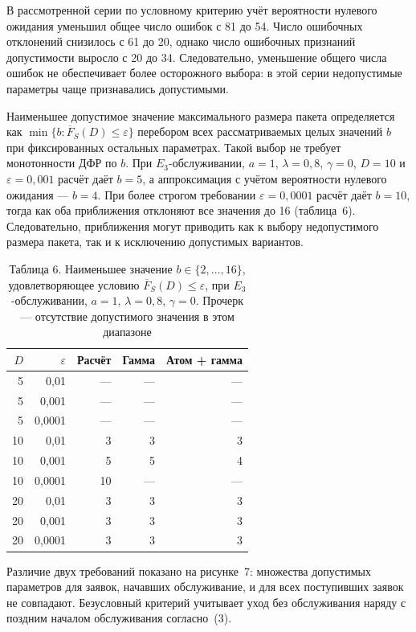 В рассмотренной серии по условному критерию учёт вероятности нулевого ожидания уменьшил общее число ошибок с 81 до 54. Число ошибочных отклонений снизилось с 61 до 20, однако число ошибочных признаний допустимости выросло с 20 до 34. Следовательно, уменьшение общего числа ошибок не обеспечивает более осторожного выбора: в этой серии недопустимые параметры чаще признавались допустимыми.

Наименьшее допустимое значение максимального размера пакета определяется как $\min\{b:\overline F_S(D)\leq\varepsilon\}$ перебором всех рассматриваемых целых значений $b$ при фиксированных остальных параметрах. Такой выбор не требует монотонности ДФР по $b$. При $E_3$-обслуживании, $a=1$, $\lambda=0{,}8$, $\gamma=0$, $D=10$ и $\varepsilon=0{,}001$ расчёт даёт $b=5$, а аппроксимация с учётом вероятности нулевого ожидания --- $b=4$. При более строгом требовании $\varepsilon=0{,}0001$ расчёт даёт $b=10$, тогда как оба приближения отклоняют все значения до 16 (таблица~6). Следовательно, приближения могут приводить как к выбору недопустимого размера пакета, так и к исключению допустимых вариантов.

\begin{table}[htbp]\centering\small
\caption{Таблица 6. Наименьшее значение $b\in\{2,\ldots,16\}$, удовлетворяющее условию $\overline F_S(D)\leq\varepsilon$, при $E_3$-обслуживании, $a=1$, $\lambda=0{,}8$, $\gamma=0$. Прочерк --- отсутствие допустимого значения в этом диапазоне}
\begin{tabular}{rrrrr}
\hline
$D$ & $\varepsilon$ & Расчёт & Гамма & Атом + гамма \\
\hline
5 & 0,01 & --- & --- & --- \\
5 & 0,001 & --- & --- & --- \\
5 & 0,0001 & --- & --- & --- \\
10 & 0,01 & 3 & 3 & 3 \\
10 & 0,001 & 5 & 5 & 4 \\
10 & 0,0001 & 10 & --- & --- \\
20 & 0,01 & 3 & 3 & 3 \\
20 & 0,001 & 3 & 3 & 3 \\
20 & 0,0001 & 3 & 3 & 3 \\
\hline
\end{tabular}

\end{table}

Различие двух требований показано на рисунке~7: множества допустимых параметров для заявок, начавших обслуживание, и для всех поступивших заявок не совпадают. Безусловный критерий учитывает уход без обслуживания наряду с поздним началом обслуживания согласно~(3).

